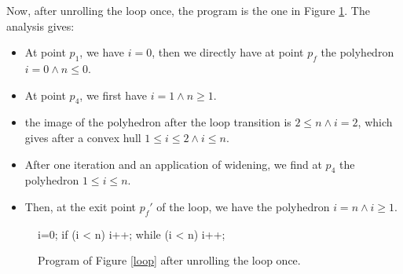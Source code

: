 \documentclass[a4paper,english,titlepage,11pt]{report}
\begin{document}
Now, after unrolling the loop once, the program is the one in Figure
\ref{loopunroll}. The analysis gives:
\begin{itemize}
\item At point $p_1$, we have $i=0$, then we directly have at point $p_f$ the
polyhedron $i=0 \wedge n \leq 0$.
\item At point $p_4$, we first have $i=1 \wedge n \geq 1$.
\item the image of the polyhedron after the loop transition is $2 \leq n \wedge
i=2$, which gives after a convex hull $ 1 \leq i \leq 2 \wedge i \leq n$.
\item After one iteration and an application of widening, we find at $p_4$ the
polyhedron $1 \leq i \leq n$.
\item Then, at the exit point $p_f'$ of the loop, we have the polyhedron
$i = n \wedge i \geq 1$.
\end{itemize}

\begin{figure}[!h]
\begin{minipage}[c]{.29\linewidth}
\begin{C}
i=0;
if (i < n) {
	i++;
	while (i < n)
		i++;
}
\end{C}
\end{minipage}
\begin{minipage}[c]{.69\linewidth}
\centering
{}
\end{minipage}
\caption{Program of Figure \ref{loop} after unrolling the loop once.}
\label{loopunroll}
\end{figure}
\end{document}
